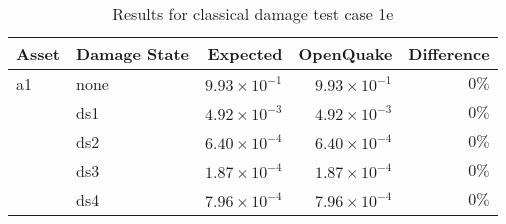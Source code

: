 \begin{table}[htbp]

\centering
\begin{tabular}{ l l r r r }

\hline
\rowcolor{anti-flashwhite}
\bf{Asset} & \bf{Damage State} & \bf{Expected} & \bf{OpenQuake} & \bf{Difference}\\
\hline
a1 & none & $9.93 \times 10^{-1}$ & $9.93 \times 10^{-1}$ & $0\%$ \\
   & ds1 & $4.92 \times 10^{-3}$ & $4.92 \times 10^{-3}$ & $0\%$ \\
   & ds2 & $6.40 \times 10^{-4}$ & $6.40 \times 10^{-4}$ & $0\%$ \\
   & ds3 & $1.87 \times 10^{-4}$ & $1.87 \times 10^{-4}$ & $0\%$ \\
   & ds4 & $7.96 \times 10^{-4}$ & $7.96 \times 10^{-4}$ & $0\%$ \\
\hline
\end{tabular}

\caption{Results for classical damage test case 1e}
\label{tab:result-cd-1e}
\end{table}